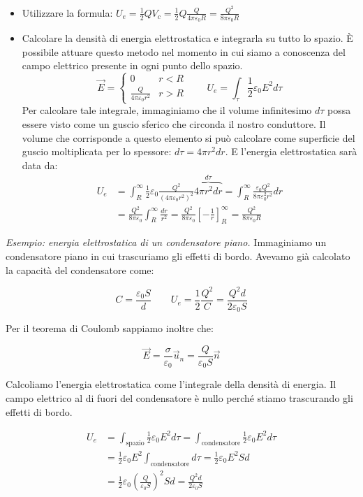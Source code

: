 \begin{itemize}
	\item Utilizzare la formula: $ U_e=\frac{1}{2} QV_c = \frac{1}{2} Q \frac{Q}{4\pi \varepsilon_0 R} = \frac{Q^2}{8\pi \varepsilon_0 R} $
	\item Calcolare la densità di energia elettrostatica e integrarla su tutto lo spazio. È possibile attuare questo metodo nel momento in cui siamo a conoscenza del campo elettrico presente in ogni punto dello spazio.
	\[
		\vec{E} = \left\{ \begin{array}{ll}
		 	0 & r<R \\
			\frac{Q}{4\pi \varepsilon_0 r^2} & r>R
		\end{array} \right. \qquad U_e = \int_{\tau}\frac{1}{2} \varepsilon_0 E^2 d\tau
	\]
	Per calcolare tale integrale, immaginiamo che il volume infinitesimo $ d\tau  $ possa essere visto come un guscio sferico che circonda il nostro conduttore. Il volume che corrisponde a questo elemento si può calcolare come superficie del guscio moltiplicata per lo spessore: $ d\tau =4\pi r^2 dr $. E l'energia elettrostatica sarà data da:
	\begin{align*}
		U_e&=\int_R^{\infty} \frac{1}{2} \varepsilon_0 \frac{Q^2}{(4\pi \varepsilon_0 r^2 )^2} \overbrace{4\pi r^2 dr}^{d\tau} = \int_R^{\infty} \frac{\varepsilon_0 Q^2}{8\pi \varepsilon_0^2 r^2} dr \\
		&= \frac{Q^2}{8\pi \varepsilon_0} \int_R^{\infty} \frac{dr}{r^2} = \frac{Q^2}{8\pi \varepsilon_0}\left[ -\frac{1}{r} \right]_R^{\infty} = \frac{Q^2}{8\pi \varepsilon_0 R}
	\end{align*}
\end{itemize}

\emph{Esempio: energia elettrostatica di un condensatore piano.} Immaginiamo un condensatore piano in cui trascuriamo gli effetti di bordo.
Avevamo già calcolato la capacità del condensatore come:

\[
	C=\frac{\varepsilon_0 S}{d} \qquad U_e=\frac{1}{2} \frac{Q^2}{C} = \frac{Q^2d}{2\varepsilon_0 S}
\]

Per il teorema di Coulomb sappiamo inoltre che:

\[
	\vec{E} = \frac{\sigma}{\varepsilon_0} \vec{u}_n = \frac{Q}{\varepsilon_0 S}\vec{n}
\]

Calcoliamo l'energia elettrostatica come l'integrale della densità di energia. Il campo elettrico al di fuori del condensatore è nullo perché stiamo trascurando gli effetti di bordo.

\begin{align*}
	U_e &= \int_{\text{spazio}}\frac{1}{2} \varepsilon_0 E^2 d\tau = \int_{\text{condensatore}} \frac{1}{2} \varepsilon_0 E^2 d\tau \\
	&= \frac{1}{2} \varepsilon_0 E^2 \int_{\text{condensatore}}d\tau = \frac{1}{2} \varepsilon_0 E^2 Sd \\
	&=\frac{1}{2} \varepsilon_0 \left( \frac{Q}{\varepsilon_0 S} \right)^2 Sd = \frac{Q^2 d}{2\varepsilon_0 S}
\end{align*}


